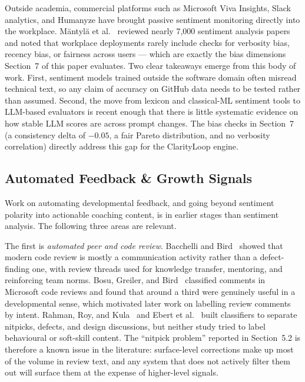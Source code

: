 \documentclass[conference]{IEEEconf}
\begin{document}
Outside academia, commercial platforms such as Microsoft Viva Insights, Slack analytics, and Humanyze have brought passive sentiment monitoring directly into the workplace. M{\"a}ntyl{\"a} et al.~\cite{mantyla2018evolution} reviewed nearly 7,000 sentiment analysis papers and noted that workplace deployments rarely include checks for verbosity bias, recency bias, or fairness across users --- which are exactly the bias dimensions Section~7 of this paper evaluates. Two clear takeaways emerge from this body of work. First, sentiment models trained outside the software domain often misread technical text, so any claim of accuracy on GitHub data needs to be tested rather than assumed. Second, the move from lexicon and classical-ML sentiment tools to LLM-based evaluators is recent enough that there is little systematic evidence on how stable LLM scores are across prompt changes. The bias checks in Section~7 (a consistency delta of $-0.05$, a fair Pareto distribution, and no verbosity correlation) directly address this gap for the ClarityLoop engine.

\subsection{Automated Feedback \& Growth Signals}
Work on automating developmental feedback, and going beyond sentiment polarity into actionable coaching content, is in earlier stages than sentiment analysis. The following three areas are relevant.

The first is \textit{automated peer and code review}. Bacchelli and Bird~\cite{bacchelli2013expectations} showed that modern code review is mostly a communication activity rather than a defect-finding one, with review threads used for knowledge transfer, mentoring, and reinforcing team norms. Bosu, Greiler, and Bird~\cite{bosu2015characteristics} classified comments in Microsoft code reviews and found that around a third were genuinely useful in a developmental sense, which motivated later work on labelling review comments by intent. Rahman, Roy, and Kula~\cite{rahman2017predicting} and Ebert et al.~\cite{ebert2019confusion} built classifiers to separate nitpicks, defects, and design discussions, but neither study tried to label behavioural or soft-skill content. The ``nitpick problem'' reported in Section~5.2 is therefore a known issue in the literature: surface-level corrections make up most of the volume in review text, and any system that does not actively filter them out will surface them at the expense of higher-level signals.
\end{document}
